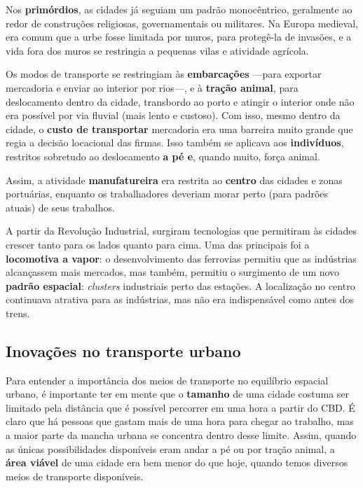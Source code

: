 \documentclass[
  12pt,
  a4paper,
]{article}
\begin{document}
Nos \textbf{primórdios}, as cidades já seguiam um padrão monocêntrico,
geralmente ao redor de construções religiosas, governamentais ou
militares. Na Europa medieval, era comum que a urbe fosse limitada por
muros, para protegê-la de invasões, e a vida fora dos muros se
restringia a pequenas vilas e atividade agrícola.

Os modos de transporte se restringiam às \textbf{embarcações} ---para
exportar mercadoria e enviar ao interior por rios---, e à \textbf{tração
animal}, para deslocamento dentro da cidade, transbordo ao porto e
atingir o interior onde não era possível por via fluvial (mais lento e
custoso). Com isso, mesmo dentro da cidade, o \textbf{custo de
transportar} mercadoria era uma barreira muito grande que regia a
decisão locacional das firmas. Isso também se aplicava aos
\textbf{indivíduos}, restritos sobretudo ao deslocamento \textbf{a pé
e}, quando muito, força animal.

Assim, a atividade \textbf{manufatureira} era restrita ao
\textbf{centro} das cidades e zonas portuárias, enquanto os
trabalhadores deveriam morar perto (para padrões atuais) de seus
trabalhos.

A partir da Revolução Industrial, surgiram tecnologias que permitiram às
cidades crescer tanto para os lados quanto para cima. Uma das principais
foi a \textbf{locomotiva a vapor}: o desenvolvimento das ferrovias
permitiu que as indústrias alcançassem mais mercados, mas também,
permitiu o surgimento de um novo \textbf{padrão espacial}:
\emph{clusters} industriais perto das estações. A localização no centro
continuava atrativa para as indústrias, mas não era indispensável como
antes dos trens.

\hypertarget{inovauxe7uxf5es-no-transporte-urbano}{%
\subsection{Inovações no transporte
urbano}\label{inovauxe7uxf5es-no-transporte-urbano}}

Para entender a importância dos meios de transporte no equilíbrio
espacial urbano, é importante ter em mente que o \textbf{tamanho} de uma
cidade costuma ser limitado pela distância que é possível percorrer em
uma hora a partir do CBD. É claro que há pessoas que gastam mais de uma
hora para chegar ao trabalho, mas a maior parte da mancha urbana se
concentra dentro desse limite. Assim, quando as únicas possibilidades
disponíveis eram andar a pé ou por tração animal, a \textbf{área viável}
de uma cidade era bem menor do que hoje, quando temos diversos meios de
transporte disponíveis.
\end{document}
